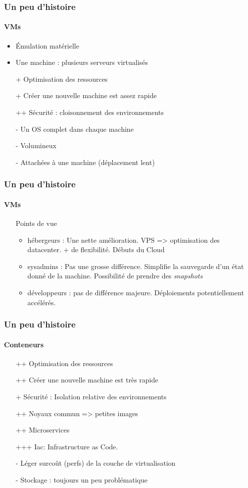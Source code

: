 \documentclass[11pt]{beamer}
\begin{document}
\begin{frame}
\frametitle{Un peu d'histoire}
\framesubtitle{VMs}
\begin{itemize}
	\item Émulation matérielle
	\item Une machine : plusieurs serveurs virtualisés
	\vspace{0.5em}
	\item[+] Optimisation des ressources
	\item[+] Créer une nouvelle machine est assez rapide
	\item[++] Sécurité : cloisonnement des environnements
	\item[-] Un OS complet dans chaque machine
	\item[-] Volumineux
	\item[-] Attachées à une machine (déplacement lent)
\end{itemize}
\end{frame}

\begin{frame}
\frametitle{Un peu d'histoire}
\framesubtitle{VMs}
\begin{itemize}
	\item[] Points de vue
	\begin{itemize}
		\item hébergeurs : Une nette amélioration. VPS => optimisation des datacenter. + de flexibilité. Débuts du Cloud
		\item sysadmins : Pas une grosse différence. Simplifie la sauvegarde d'un état donné de la machine. Possibilité de prendre des \textit{snapshots}
		\item développeurs : pas de différence majeure. Déploiements potentiellement accélérés.
	\end{itemize}
\end{itemize}
\end{frame}

\begin{frame}
\frametitle{Un peu d'histoire}
\framesubtitle{Conteneurs}
\begin{itemize}
	\item[++] Optimisation des ressources
	\item[++] Créer une nouvelle machine est très rapide
	\item[+] Sécurité : Isolation relative des environnements
	\item[++] Noyaux commun => petites images 
	\item[++] Microservices
	\item[+++] Iac: Infrastructure as Code. 
	\item[-] Léger surcoût (perfs) de la couche de virtualisation
	\item[-] Stockage : toujours un peu problématique
\end{itemize}
\end{frame}
\end{document}
